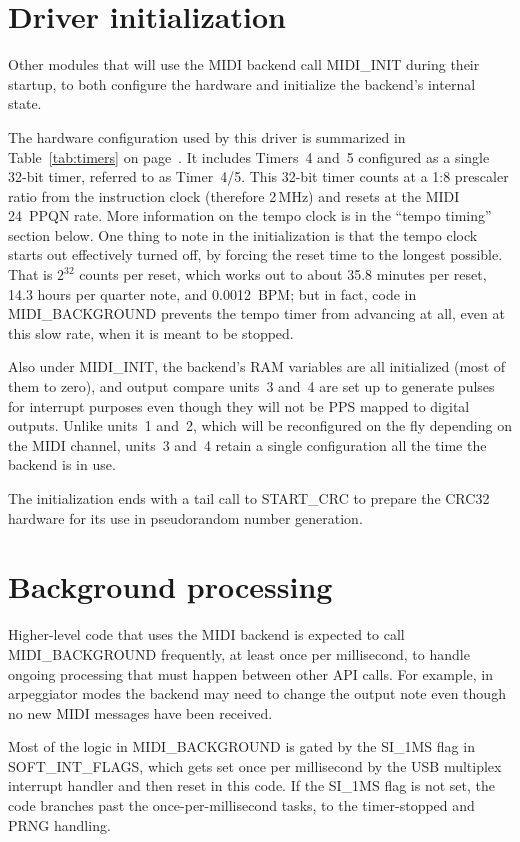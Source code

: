 \section{Driver initialization}

Other modules that will use the MIDI backend call MIDI\_INIT during their
startup, to both configure the hardware and initialize the backend's
internal state.

The hardware configuration used by this driver is summarized in
Table~\ref{tab:timers} on page~\pageref{tab:timers}.  It includes Timers~4
and~5 configured as a single 32-bit timer, referred to as Timer~4/5.  This
32-bit timer counts at a 1:8 prescaler ratio from the instruction clock
(therefore 2\,MHz) and resets at the MIDI 24~PPQN rate.  More information on
the tempo clock is in the ``tempo timing'' section below.  One thing to note
in the initialization is that the tempo clock starts out effectively turned
off, by forcing the reset time to the longest possible.  That is $2^{32}$
counts per reset, which works out to about 35.8 minutes per reset, 14.3
hours per quarter note, and 0.0012~BPM; but in fact, code in
MIDI\_BACKGROUND prevents the tempo timer from advancing at all, even at
this slow rate, when it is meant to be stopped.

Also under MIDI\_INIT, the backend's RAM variables are all initialized (most
of them to zero), and output compare units~3 and~4 are set up to generate
pulses for interrupt purposes even though they will not be PPS mapped to
digital outputs.  Unlike units~1 and~2, which will be reconfigured on the
fly depending on the MIDI channel, units~3 and~4 retain a single
configuration all the time the backend is in use.

The initialization ends with a tail call to START\_CRC to prepare the CRC32
hardware for its use in pseudorandom number generation.

\section{Background processing}

Higher-level code that uses the MIDI backend is expected to call
MIDI\_BACKGROUND frequently, at least once per millisecond, to handle
ongoing processing that must happen between other API calls.  For example,
in arpeggiator modes the backend may need to change the output note even
though no new MIDI messages have been received.

Most of the logic in MIDI\_BACKGROUND is gated by the SI\_1MS flag in
SOFT\_INT\_FLAGS, which gets set once per millisecond by the USB multiplex
interrupt handler and then reset in this code.  If the SI\_1MS flag is not
set, the code branches past the once-per-millisecond tasks, to the
timer-stopped and PRNG handling.


